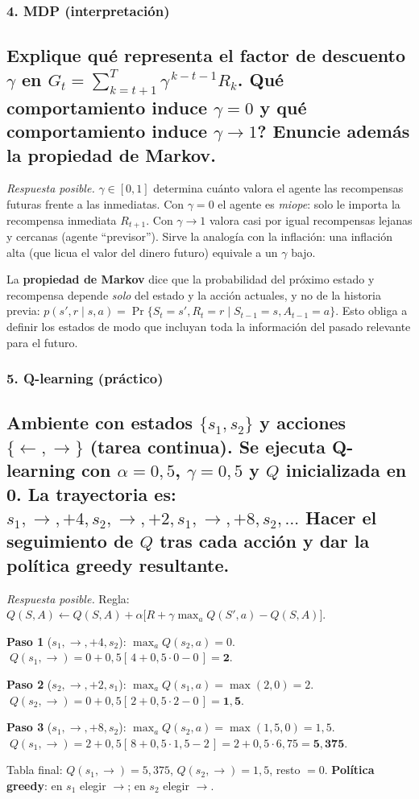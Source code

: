 \documentclass[11pt, a4paper]{article}
\newcommand{\pregunta}[1]{\subsection{#1}}
\newcommand{\eje}[1]{\subsubsection{#1}}
\begin{document}
\eje{4. MDP (interpretaci\'on)}
\pregunta{Explique qu\'e representa el \textbf{factor de descuento} $\gamma$ en $G_t = \sum_{k=t+1}^{T}\gamma^{\,k-t-1}R_k$. \textquestiondown Qu\'e comportamiento induce $\gamma=0$ y qu\'e comportamiento induce $\gamma\to 1$? Enuncie adem\'as la \textbf{propiedad de Markov}.}

\begin{respuesta}
\textit{Respuesta posible.} $\gamma \in [0,1]$ determina cu\'anto valora el agente las recompensas futuras frente a las inmediatas. Con \textbf{$\gamma=0$} el agente es \emph{miope}: solo le importa la recompensa inmediata $R_{t+1}$. Con \textbf{$\gamma\to 1$} valora casi por igual recompensas lejanas y cercanas (agente ``previsor''). Sirve la analog\'ia con la inflaci\'on: una inflaci\'on alta (que licua el valor del dinero futuro) equivale a un $\gamma$ bajo.

La \textbf{propiedad de Markov} dice que la probabilidad del pr\'oximo estado y recompensa depende \emph{solo} del estado y la acci\'on actuales, y no de la historia previa: $p(s',r\mid s,a)=\Pr\{S_t{=}s',R_t{=}r \mid S_{t-1}{=}s, A_{t-1}{=}a\}$. Esto obliga a definir los estados de modo que incluyan toda la informaci\'on del pasado relevante para el futuro.
\end{respuesta}

\eje{5. Q-learning (pr\'actico)}
\pregunta{Ambiente con estados $\{s_1, s_2\}$ y acciones $\{\leftarrow, \rightarrow\}$ (tarea continua). Se ejecuta Q-learning con $\alpha=0{,}5$, $\gamma=0{,}5$ y $Q$ inicializada en 0. La trayectoria es: $s_1, \rightarrow, +4, s_2, \rightarrow, +2, s_1, \rightarrow, +8, s_2, \dots$ Hacer el seguimiento de $Q$ tras cada acci\'on y dar la pol\'itica greedy resultante.}

\begin{respuesta}
\textit{Respuesta posible.} Regla: $Q(S,A)\leftarrow Q(S,A) + \alpha\big[R + \gamma\max_a Q(S',a) - Q(S,A)\big]$.

\textbf{Paso 1} ($s_1,\rightarrow,+4,s_2$): $\max_a Q(s_2,a)=0$.
$\;Q(s_1,\rightarrow)=0+0{,}5[\,4+0{,}5\cdot 0-0\,]=\mathbf{2}$.

\textbf{Paso 2} ($s_2,\rightarrow,+2,s_1$): $\max_a Q(s_1,a)=\max(2,0)=2$.
$\;Q(s_2,\rightarrow)=0+0{,}5[\,2+0{,}5\cdot 2-0\,]=\mathbf{1{,}5}$.

\textbf{Paso 3} ($s_1,\rightarrow,+8,s_2$): $\max_a Q(s_2,a)=\max(1{,}5,0)=1{,}5$.
$\;Q(s_1,\rightarrow)=2+0{,}5[\,8+0{,}5\cdot 1{,}5-2\,]=2+0{,}5\cdot 6{,}75=\mathbf{5{,}375}$.

Tabla final: $Q(s_1,\rightarrow)=5{,}375$, $Q(s_2,\rightarrow)=1{,}5$, resto $=0$.
\textbf{Pol\'itica greedy}: en $s_1$ elegir $\rightarrow$; en $s_2$ elegir $\rightarrow$.
\end{respuesta}
\end{document}
